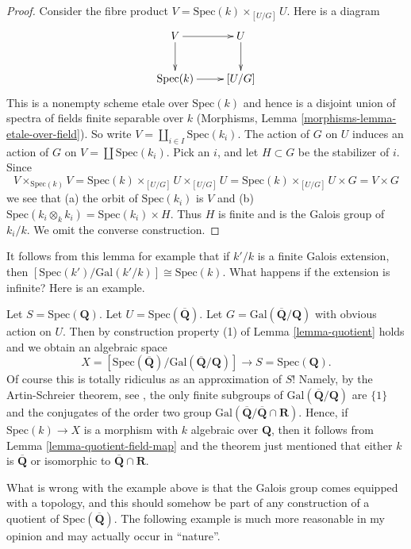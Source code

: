 \begin{proof}
Consider the fibre product $V = \text{Spec}(k) \times_{[U/G]} U$.
Here is a diagram
$$
\xymatrix{
V \ar[r] \ar[d] & U \ar[d] \\
\text{Spec}(k) \ar[r] & [U/G]
}
$$
This is a nonempty scheme etale over $\text{Spec}(k)$ and hence is a
disjoint union of spectra of fields finite separable over $k$
(Morphisms, Lemma \ref{morphisms-lemma-etale-over-field}). So write
$V = \coprod_{i \in I} \text{Spec}(k_i)$.
The action of $G$ on $U$ induces an action of $G$ on
$V = \coprod \text{Spec}(k_i)$. Pick an $i$, and let $H \subset G$ be
the stabilizer of $i$. Since
$$
V \times_{\text{Spec}(k)} V =
\text{Spec}(k) \times_{[U/G]} U \times_{[U/G]} U =
\text{Spec}(k) \times_{[U/G]} U \times G =
V \times G
$$
we see that (a) the orbit of $\text{Spec}(k_i)$ is $V$ and
(b) $\text{Spec}(k_i \otimes_k k_i) = \text{Spec}(k_i) \times H$.
Thus $H$ is finite and is the Galois group of $k_i/k$.
We omit the converse construction.
\end{proof}

\noindent
It follows from this lemma for example that
if $k'/k$ is a finite Galois extension, then
$[\text{Spec}(k')/\text{Gal}(k'/k)] \cong \text{Spec}(k)$.
What happens if the extension is infinite? Here is an example.

\begin{example}
\label{example-Qbar}
Let $S = \text{Spec}(\mathbf{Q})$.
Let $U = \text{Spec}(\overline{\mathbf{Q}})$.
Let $G = \text{Gal}(\overline{\mathbf{Q}}/\mathbf{Q})$ with obvious
action on $U$. Then by construction property (1) of
Lemma \ref{lemma-quotient} holds and we obtain an algebraic space
$$
X = [\text{Spec}(\overline{\mathbf{Q}})/
\text{Gal}(\overline{\mathbf{Q}}/\mathbf{Q})]
\longrightarrow
S = \text{Spec}(\mathbf{Q}).
$$
Of course this is totally ridiculus as an approximation of $S$!
Namely, by the Artin-Schreier theorem,
see \cite[Theorem 17, page 316]{JacobsonIII},
the only finite subgroups of $\text{Gal}(\overline{\mathbf{Q}}/\mathbf{Q})$
are $\{1\}$ and the conjugates of the order two group
$\text{Gal}(\overline{\mathbf{Q}}/\overline{\mathbf{Q}} \cap \mathbf{R})$.
Hence, if
$\text{Spec}(k) \to X$ is a morphism with $k$ algebraic over $\mathbf{Q}$,
then it follows from Lemma \ref{lemma-quotient-field-map} and the theorem
just mentioned that either $k$ is $\overline{\mathbf{Q}}$ or isomorphic to
$\overline{\mathbf{Q}} \cap \mathbf{R}$.
\end{example}

\noindent
What is wrong with the example above is that
the Galois group comes equipped with a topology,
and this should somehow be part of any construction
of a quotient of $\text{Spec}(\overline{\mathbf{Q}})$.
The following example is much more reasonable in my opinion
and may actually occur in ``nature''.

